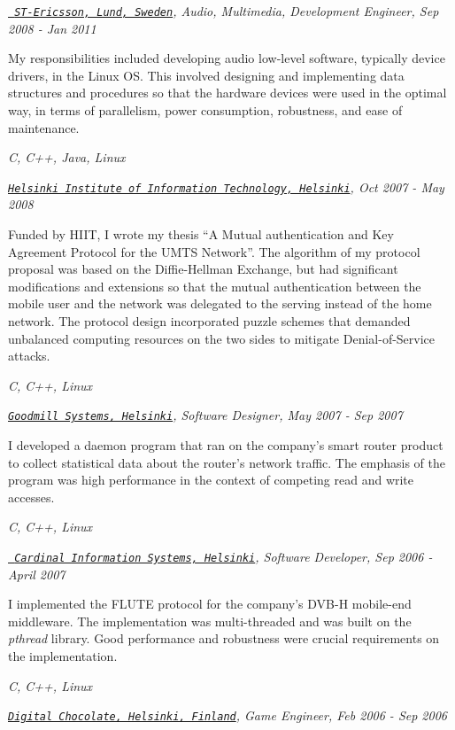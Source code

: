 \documentclass[a4paper]{twentysecondcv} %
\newenvironment{aperiod}{
  \begin{list}{}{
    \setlength{\leftmargin}{1.5em}
    \setlength{\itemsep}{1em}
    \setlength{\parskip}{0pt}
    \setlength{\parsep}{0.25em}
  }
}{
  \end{list}
}
\begin{document}
\begin{aperiod}
\item {\it \href{http://www.stericsson.com}{\tt
      ST-Ericsson, Lund, Sweden}, Audio, Multimedia, Development
    Engineer, Sep 2008 - Jan 2011}

  My responsibilities included developing audio low-level software,
  typically device drivers, in the Linux OS. This involved designing and
  implementing data structures and procedures so that the hardware
  devices were used in the optimal way, in terms of parallelism,
  power consumption, robustness, and ease of maintenance.

  {\it C, C++, Java, Linux}
\item {\it \href{http://www.hiit.fi}{\tt Helsinki
      Institute of Information Technology, Helsinki}, Oct 2007 - May 2008}

  Funded by HIIT, I wrote my thesis ``A Mutual authentication and Key
  Agreement Protocol for the UMTS Network''. The algorithm of my
  protocol proposal was based on the Diffie-Hellman Exchange, but had
  significant modifications and extensions so that the mutual
  authentication between the mobile user and the network was delegated
  to the serving instead of the home network. The protocol design
  incorporated puzzle schemes that demanded unbalanced computing
  resources on the two sides to mitigate Denial-of-Service attacks.
  
  {\it C, C++, Linux}
\item {\it
    \href{http://www.goodmillsystems.com}{\tt Goodmill Systems,
      Helsinki}, Software Designer, May 2007 - Sep 2007}

  I developed a daemon program that ran on the company's smart router
  product to collect statistical data about the router's network
  traffic. The emphasis of the program was high performance in the
  context of competing read and write accesses.

  {\it C, C++, Linux}
\item {\it \href{http://www.cardinal.fi/}{\tt
      Cardinal Information Systems, Helsinki}, Software
    Developer, Sep 2006 - April 2007}

  I implemented the FLUTE protocol for the company's DVB-H
  mobile-end middleware. The implementation was multi-threaded and was
  built on the {\it pthread} library. Good performance and robustness
  were crucial requirements on the implementation.

  {\it C, C++, Linux}
\item {\it
    \href{http://www.digitalchocolate.com/}{\tt Digital Chocolate,
      Helsinki, Finland}, Game Engineer, Feb 2006 - Sep 2006}


\end{aperiod}
\end{document}
